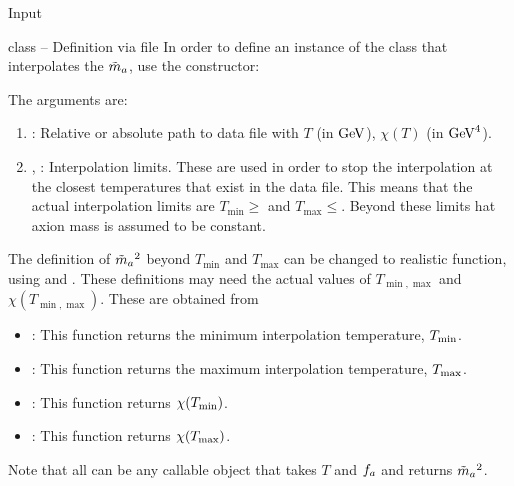 \documentclass[10pt,utf8,compress,xcolor=dvipsnames]{beamer}
\begin{document}

\begin{frame}[noframenumbering]
	\begin{center}
		{\color{yellow} \Huge \CPP  Input}
	\end{center}
\end{frame}
%


\begin{frame}{ class -- Definition via file}
	\fontB
	In order to define an instance of the  class that interpolates the $\tilde m_{a}{}$, use the constructor:
	\lstset{language = c++}
	
	The arguments are:
	\begin{enumerate}
		\item {}: Relative or absolute path to data file with $T$ (in ${\rm GeV}$), $\chi(T)$ (in ${\rm GeV}^4$).
		\item {}, : Interpolation limits. These are used in order to stop the interpolation at the closest temperatures that exist in the data file. This means that the actual interpolation limits are $T_{\min}\geq$ and $T_{\max}\leq$. Beyond these limits hat axion mass is assumed to be constant.
	\end{enumerate}
	
	The definition of $\tilde m_{a}{}^2$ beyond $T_{\min}$ and $T_{\max}$ can be changed to realistic function, using   and . These definitions may need the actual values of   $T_{\min,\max}$ and $\chi(T_{\min,\max})$. These are obtained from
	\begin{itemize}
		\item {}: This function returns the minimum interpolation temperature, $T_{\rm min}$. 
		\item {}: This function returns the maximum interpolation temperature, $T_{\rm max}$.
		\item {}: This function returns $\chi(T_{\rm min})$.
		\item {}: This function returns $\chi(T_{\rm max})$.
	\end{itemize}

	Note that all  can be any callable object that takes $T$ and $f_{a}{}$ and returns $\tilde m_{a}{}^2$.

\end{frame}
\end{document}
